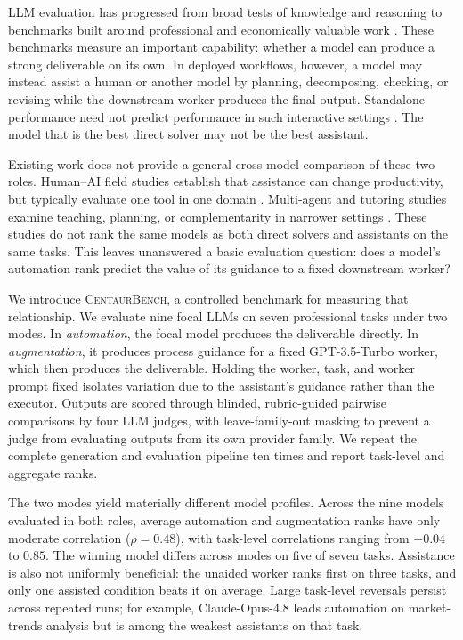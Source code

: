LLM evaluation has progressed from broad tests of knowledge and reasoning
\citep{hendrycks2021,srivastava2023,liang2023} to benchmarks built around
professional and economically valuable work
\citep{gdpval2025,profbench2025,occubench2026,jobbench2026}. These benchmarks
measure an important capability: whether a model can produce a strong
deliverable on its own. In deployed workflows, however, a model may instead
assist a human or another model by planning, decomposing, checking, or revising
while the downstream worker produces the final output. Standalone performance
need not predict performance in such interactive settings
\citep{collins2024,chang2025}. The model that is the best direct solver may not
be the best assistant.

Existing work does not provide a general cross-model comparison of these two
roles. Human--AI field studies establish that assistance can change
productivity, but typically evaluate one tool in one domain
\citep{noy2023,peng2023,dellacqua2023,brynjolfsson2025}. Multi-agent and
tutoring studies examine teaching, planning, or complementarity in narrower
settings \citep{saha2023,bansal2021,macina2025,gandhi2025}. These studies do
not rank the same models as both direct solvers and assistants on the same
tasks. This leaves unanswered a basic evaluation question: does a model's
automation rank predict the value of its guidance to a fixed downstream
worker?

We introduce \textsc{CentaurBench}, a controlled benchmark for measuring that
relationship. We evaluate nine focal LLMs on seven professional tasks under
two modes. In \emph{automation}, the focal model produces the deliverable
directly. In \emph{augmentation}, it produces process guidance for a fixed
GPT-3.5-Turbo worker, which then produces the deliverable. Holding the worker,
task, and worker prompt fixed isolates variation due to the assistant's
guidance rather than the executor. Outputs are scored through blinded,
rubric-guided pairwise comparisons by four LLM judges, with leave-family-out
masking to prevent a judge from evaluating outputs from its own provider
family. We repeat the complete generation and evaluation pipeline ten times
and report task-level and aggregate ranks.

The two modes yield materially different model profiles. Across the nine
models evaluated in both roles, average automation and augmentation ranks have
only moderate correlation ($\rho=0.48$), with task-level correlations ranging
from $-0.04$ to $0.85$. The winning model differs across modes on five of seven
tasks. Assistance is also not uniformly beneficial: the unaided worker ranks
first on three tasks, and only one assisted condition beats it on average.
Large task-level reversals persist across repeated runs; for example,
Claude-Opus-4.8 leads automation on market-trends analysis but is among the
weakest assistants on that task.

